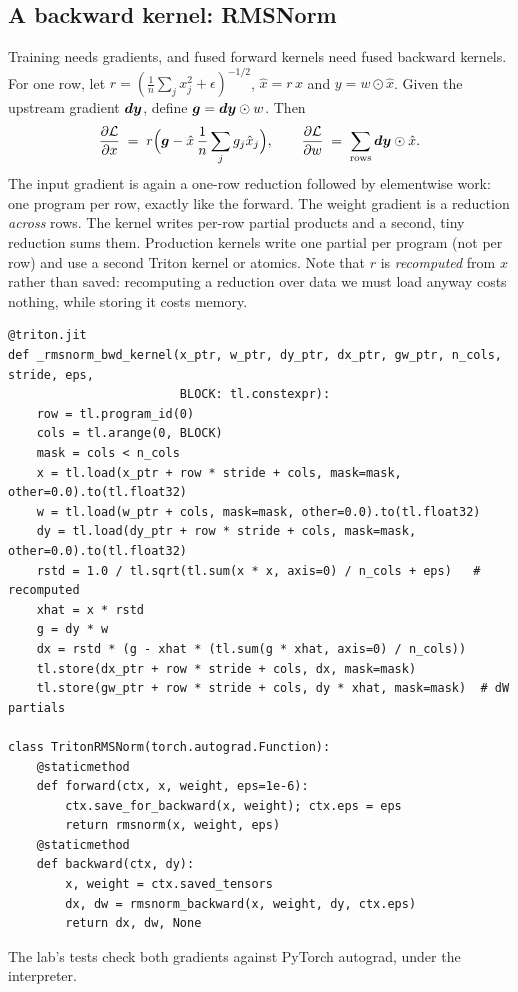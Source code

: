 \subsection{A backward kernel: RMSNorm}
Training needs gradients, and fused forward kernels need fused backward kernels.
For one row, let $r=(\frac1n\sum_j x_j^2+\epsilon)^{-1/2}$, $\hat x=r\,x$ and
$y=w\odot\hat x$. Given the upstream gradient $\bm{dy}$, define $\bm{g}=\bm{dy}\odot w$.
Then
\begin{equation}
  \frac{\partial \mathcal L}{\partial x} \;=\; r\Big(\bm{g} - \hat x\,\frac{1}{n}\sum_j g_j\hat x_j\Big),
  \qquad
  \frac{\partial \mathcal L}{\partial w} \;=\; \sum_{\text{rows}} \bm{dy}\odot\hat x .
  \label{eq:triton:rmsbwd}
\end{equation}
The input gradient is again a one-row reduction followed by elementwise work: one
program per row, exactly like the forward. The weight gradient is a reduction
\emph{across} rows. The kernel writes per-row partial products and a second, tiny
reduction sums them. Production kernels write one partial per program (not per row)
and use a second Triton kernel or atomics. Note that $r$ is \emph{recomputed} from $x$
rather than saved: recomputing a reduction over data we must load anyway costs nothing,
while storing it costs memory.

\begin{lstlisting}[caption={Fused RMSNorm backward and its autograd wrapper.},
label={lst:triton:rmsbwd}]
@triton.jit
def _rmsnorm_bwd_kernel(x_ptr, w_ptr, dy_ptr, dx_ptr, gw_ptr, n_cols, stride, eps,
                        BLOCK: tl.constexpr):
    row = tl.program_id(0)
    cols = tl.arange(0, BLOCK)
    mask = cols < n_cols
    x = tl.load(x_ptr + row * stride + cols, mask=mask, other=0.0).to(tl.float32)
    w = tl.load(w_ptr + cols, mask=mask, other=0.0).to(tl.float32)
    dy = tl.load(dy_ptr + row * stride + cols, mask=mask, other=0.0).to(tl.float32)
    rstd = 1.0 / tl.sqrt(tl.sum(x * x, axis=0) / n_cols + eps)   # recomputed
    xhat = x * rstd
    g = dy * w
    dx = rstd * (g - xhat * (tl.sum(g * xhat, axis=0) / n_cols))
    tl.store(dx_ptr + row * stride + cols, dx, mask=mask)
    tl.store(gw_ptr + row * stride + cols, dy * xhat, mask=mask)  # dW partials

class TritonRMSNorm(torch.autograd.Function):
    @staticmethod
    def forward(ctx, x, weight, eps=1e-6):
        ctx.save_for_backward(x, weight); ctx.eps = eps
        return rmsnorm(x, weight, eps)
    @staticmethod
    def backward(ctx, dy):
        x, weight = ctx.saved_tensors
        dx, dw = rmsnorm_backward(x, weight, dy, ctx.eps)
        return dx, dw, None
\end{lstlisting}
The lab's tests check both gradients against PyTorch autograd, under the interpreter.

